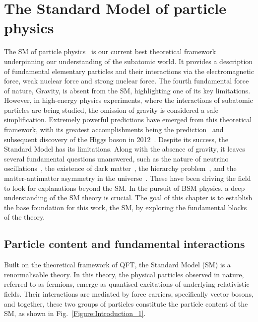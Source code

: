 \chapter{The Standard Model of particle physics}
\thispagestyle{plain}  %
\pagestyle{chapterpages}
\label{Section:Chapter1}
The \ac{SM} of particle physics~\cite{Glashow_1, Weinberg_1, Salam_1} is our current best theoretical framework underpinning our understanding of the subatomic world. It provides a description of fundamental elementary particles and their interactions via the electromagnetic force, weak nuclear force and strong nuclear force. The fourth fundamental force of nature, Gravity, is absent from the SM, highlighting one of its key limitations. However, in high-energy physics experiments, where the interactions of subatomic particles are being studied, the omission of gravity is considered a safe simplification. Extremely powerful predictions have emerged from this theoretical framework, with its greatest accomplishments being the prediction~\cite{Englert_Brout,PeterHiggs_1,PeterHiggs_2, PeterHiggs_3, Guralnik_Hagen_Kibble, Kibble} and subsequent discovery of the Higgs boson in 2012~\cite{Higgs_ATLAS,Higgs_CMS}. Despite its success, the Standard Model has its limitations. Along with the absence of gravity, it leaves several fundamental questions unanswered, such as the nature of neutrino oscillations~\cite{Neutrino_Oscillations}, the existence of dark matter~\cite{DarkMatter}, the hierarchy problem~\cite{HierarchyProblem}, and the matter-antimatter asymmetry in the universe~\cite{MatterAntimatter}. These have been driving the field to look for explanations beyond the SM. In the pursuit of \ac{BSM} physics, a deep understanding of the SM theory is crucial. The goal of this chapter is to establish the base foundation for this work, the SM, by exploring the fundamental blocks of the theory.

\section{Particle content and fundamental interactions}
\label{Section:Particle content and fundamental interactions}
Built on the theoretical framework of \ac{QFT}, the Standard Model (SM) is a renormalisable theory. In this theory, the physical particles observed in nature, referred to as fermions, emerge as quantised excitations of underlying relativistic fields. Their interactions are mediated by force carriers, specifically vector bosons, and together, these two groups of particles constitute the particle content of the SM, as shown in Fig.~\ref{Figure:Introduction_1}.

